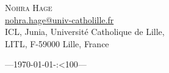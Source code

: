 \documentclass[a4paper, twoside, 11pt, english]{article}
\theoremstyle{plain}
\theoremstyle{definition}
\def\hhmm{\number\hh:\ifnum\mm<10{}0\fi\number\mm}
\begin{document}
\quad

\vfill
\begin{flushright}
\begin{small}
\noindent \textsc{Nohra Hage} \\
\url{nohra.hage@univ-catholille.fr} \\
ICL, Junia, Université Catholique de Lille,\\
 LITL, F-59000 Lille, France\\
\end{small}
\end{flushright}

\vspace{0.25cm}

\begin{small}---\;\;\today\;\;-\;\;\hhmm\;\;---\end{small} \hfill
\end{document}

